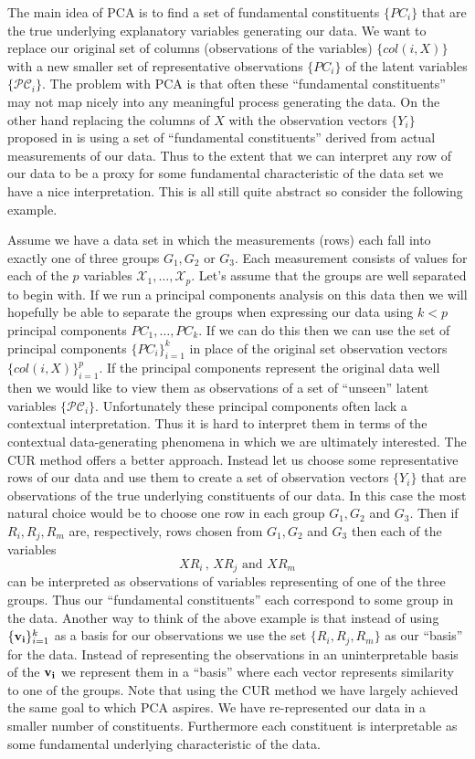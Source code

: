 \documentclass{book}
\begin{document}
The main idea of PCA is to find a set of fundamental constituents $\{PC_i\}$ that are the true underlying explanatory variables generating our data. We want to replace our original set of columns (observations of the variables) $\{col(i,X)\}$ with a new smaller set of representative observations $\{PC_i\}$ of the latent variables $\{\mathscr{PC}_i\}$. The problem with PCA is that often these ``fundamental constituents'' may not map nicely into any meaningful process generating the data. On the other hand replacing the columns of $X$ with the observation vectors $\{Y_i\}$ proposed in \cite{pnas} is using a set of ``fundamental constituents'' derived from actual measurements of our data. Thus to the extent that we can interpret any row of our data to be a proxy for some fundamental characteristic of the data set we have a nice interpretation. This is all still quite abstract so consider the following example. 

Assume we have a data set in which the measurements (rows) each fall into exactly one of three groups $G_1,G_2$ or $G_3$. Each measurement consists of values for each of the $p$ variables $\mathscr{X}_1,\ldots,\mathscr{X}_p$. Let's assume that the groups are well separated to begin with. If we run a principal components analysis on this data then we will hopefully be able to separate the groups when expressing our data using $k<p$ principal components $PC_1,\ldots,PC_k$. If we can do this then we can use the set of principal components $\{PC_i\}_{i=1}^{k}$ in place of the original set observation vectors $\{col(i,X)\}_{i=1}^{p}$. If the principal components represent the original data well then we would like to view them as observations of a set of ``unseen'' latent variables $\{\mathscr{PC}_i\}$. Unfortunately these principal components often lack a contextual interpretation. Thus it is hard to interpret them in terms of the contextual data-generating phenomena in which we are ultimately interested. The CUR method offers a better approach. Instead let us choose some representative rows of our data and use them to create a set of observation vectors $\{Y_i\}$ that are observations of the true underlying constituents of our data. In this case the most natural choice would be to choose one row in each group $G_1,G_2$ and $G_3$. Then if $R_i,R_j,R_m$ are, respectively, rows chosen from $G_1,G_2$ and $G_3$ then each of the variables 
$$
XR_i\,\text{,  }XR_j\text{ and }XR_m
$$
can be interpreted as observations of variables representing of one of the three groups. Thus our ``fundamental constituents'' each correspond to some group in the data. Another way to think of the above example is that instead of using $\{{\bf v_i}\}_{i=1}^{k}$ as a basis for our observations we use the set $\{R_i,R_j,R_m\}$ as our ``basis'' for the data. Instead of representing the observations in an uninterpretable basis of the ${\bf v_i}$ we represent them in a ``basis'' where each vector represents similarity to one of the groups.  Note that using the CUR method we have largely achieved the same goal to which PCA aspires. We have re-represented our data in a smaller number of constituents. Furthermore each constituent is interpretable as some fundamental underlying characteristic of the data. 
\end{document}
